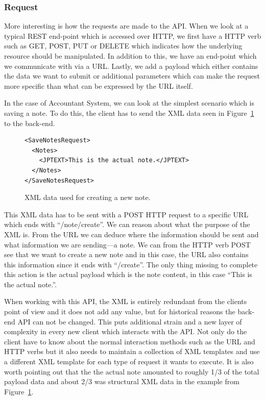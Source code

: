 \documentclass{cslthse-msc}
\begin{document}
\subsubsection{Request}
More interesting is how the requests are made to the API. When we look at a typical REST end-point which is accessed over HTTP, we first have a HTTP verb such as GET, POST, PUT or DELETE which indicates how the underlying resource should be manipulated. In addition to this, we have an end-point which we communicate with via a URL. Lastly, we add a payload which either contains the data we want to submit or additional parameters which can make the request more specific than what can be expressed by the URL itself.

In the case of Accountant System, we can look at the simplest scenario which is saving a note. To do this, the client has to send the XML data seen in Figure~\ref{fig:xml_account_example} to the back-end.

\begin{figure}[H]
  \centering
    \begin{center}
\begin{lstlisting}[breaklines=true,frame=single]
<SaveNotesRequest>
  <Notes>
    <JPTEXT>This is the actual note.</JPTEXT>
  </Notes>
</SaveNotesRequest>
\end{lstlisting}
    \end{center}
  \caption{XML data used for creating a new note.}
  \label{fig:xml_account_example}
\end{figure}


This XML data has to be sent with a POST HTTP request to a specific URL which ends with \enquote{/note/create}. We can reason about what the purpose of the XML is. From the URL we can deduce where the information should be sent and what information we are sending---a note. We can from the HTTP verb POST see that we want to create a new note and in this case, the URL also contains this information since it ends with \enquote{/create}. The only thing missing to complete this action is the actual payload which is the note content, in this case \enquote{This is the actual note.}.

When working with this API, the XML is entirely redundant from the clients point of view and it does not add any value, but for historical reasons the back-end API can not be changed. This puts additional strain and a new layer of complexity in every new client which interacts with the API. Not only do the client have to know about the normal interaction methods such as the URL and HTTP verbs but it also needs to maintain a collection of XML templates and use a different XML template for each type of request it wants to execute. It is also worth pointing out that the the actual note amounted to roughly 1/3 of the total payload data and about 2/3 was structural XML data in the example from Figure~\ref{fig:xml_account_example}.
\end{document}
